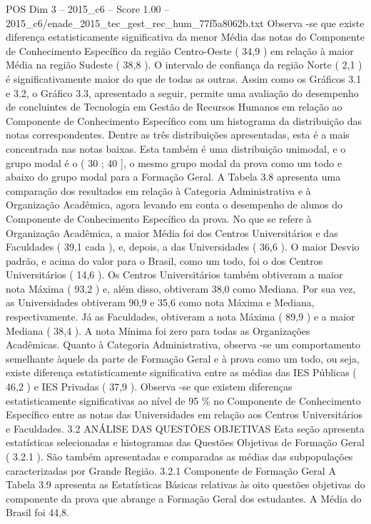 \begin{textsample}{POS Dim 3 – 2015\_c6 – Score 1.00 – 2015\_c6/enade\_2015\_tec\_gest\_rec\_hum\_77f5a8062b.txt}
Observa -se que existe diferença estatisticamente significativa da menor Média das notas do Componente de Conhecimento Específico da região Centro-Oeste ( 34,9 ) em relação à maior Média na região Sudeste ( 38,8 ).
O intervalo de confiança da região Norte ( 2,1 ) é significativamente maior do que de todas as outras.
Assim como os Gráficos 3.1 e 3.2, o Gráfico 3.3, apresentado a seguir, permite uma avaliação do desempenho de concluintes de Tecnologia em Gestão de Recursos Humanos em relação ao Componente de Conhecimento Específico com um histograma da distribuição das notas correspondentes.
Dentre as três distribuições apresentadas, esta é a mais concentrada nas notas baixas.
Esta também é uma distribuição unimodal, e o grupo modal é o ( 30 ; 40 ], o mesmo grupo modal da prova como um todo e abaixo do grupo modal para a Formação Geral.
A Tabela 3.8 apresenta uma comparação dos resultados em relação à Categoria Administrativa e à Organização Acadêmica, agora levando em conta o desempenho de alunos do Componente de Conhecimento Específico da prova.
No que se refere à Organização Acadêmica, a maior Média foi dos Centros Universitários e das Faculdades ( 39,1 cada ), e, depois, a das Universidades ( 36,6 ).
O maior Desvio padrão, e acima do valor para o Brasil, como um todo, foi o dos Centros Universitários ( 14,6 ).
Os Centros Universitários também obtiveram a maior nota Máxima ( 93,2 ) e, além disso, obtiveram 38,0 como Mediana.
Por sua vez, as Universidades obtiveram 90,9 e 35,6 como nota Máxima e Mediana, respectivamente.
Já as Faculdades, obtiveram a nota Máxima ( 89,9 ) e a maior Mediana ( 38,4 ).
A nota Mínima foi zero para todas as Organizações Acadêmicas.
Quanto à Categoria Administrativa, observa -se um comportamento semelhante àquele da parte de Formação Geral e à prova como um todo, ou seja, existe diferença estatisticamente significativa entre as médias das IES Públicas ( 46,2 ) e IES Privadas ( 37,9 ).
Observa -se que existem diferenças estatisticamente significativas ao nível de 95 \% no Componente de Conhecimento Específico entre as notas das Universidades em relação aos Centros Universitários e Faculdades. 3.2 ANÁLISE DAS QUESTÕES OBJETIVAS Esta seção apresenta estatísticas selecionadas e histogramas das Questões Objetivas de Formação Geral ( 3.2.1 ).
São também apresentadas e comparadas as médias das subpopulações caracterizadas por Grande Região. 3.2.1 Componente de Formação Geral A Tabela 3.9 apresenta as Estatísticas Básicas relativas às oito questões objetivas do componente da prova que abrange a Formação Geral dos estudantes.
A Média do Brasil foi 44,8.

\end{textsample}
